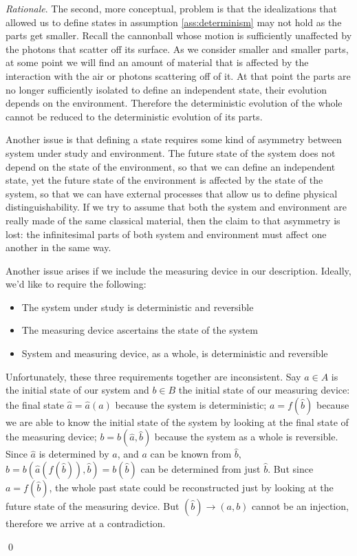 \documentclass[aps,pra,10pt,twocolumn,floatfix,nofootinbib]{revtex4-1}
\numberwithin{equation}{section}
\theoremstyle{definition}
\newenvironment{rationale}{\emph{Rationale}.}{\qed}
\begin{document}
\begin{rationale}
	The second, more conceptual, problem is that the idealizations that allowed us to define states in assumption \ref{ass:determinism} may not hold as the parts get smaller. Recall the cannonball whose motion is sufficiently unaffected by the photons that scatter off its surface. As we consider smaller and smaller parts, at some point we will find an amount of material that is affected by the interaction with the air or photons scattering off of it. At that point the parts are no longer sufficiently isolated to define an independent state, their evolution depends on the environment. Therefore the deterministic evolution of the whole cannot be reduced to the deterministic evolution of its parts.
	
	Another issue is that defining a state requires some kind of asymmetry between system under study and environment. The future state of the system does not depend on the state of the environment, so that we can define an independent state, yet the future state of the environment is affected by the state of the system, so that we can have external processes that allow us to define physical distinguishability. If we try to assume that both the system and environment are really made of the same classical material, then the claim to that asymmetry is lost: the infinitesimal parts of both system and environment must affect one another in the same way.
	
	Another issue arises if we include the measuring device in our description. Ideally, we'd like to require the following:
	\begin{itemize}[noitemsep]
		\item The system under study is deterministic and reversible
		\item The measuring device ascertains the state of the system
		\item System and measuring device, as a whole, is deterministic and reversible
	\end{itemize}
	Unfortunately, these three requirements together are inconsistent. Say $a \in A$ is the initial state of our system and $b \in B$ the initial state of our measuring device: the final state $\hat{a}=\hat{a}(a)$ because the system is deterministic; $a=f(\hat{b})$ because we are able to know the initial state of the system by looking at the final state of the measuring device; $b=b(\hat{a},\hat{b})$ because the system as a whole is reversible. Since $\hat{a}$ is determined by $a$, and $a$ can be known from $\hat{b}$, $b = b(\hat{a}(f(\hat{b})), \hat{b}) = b(\hat{b})$ can be determined from just $\hat{b}$. But since $a=f(\hat{b})$, the whole past state could be reconstructed just by looking at the future state of the measuring device. But $(\hat{b}) \rightarrow (a, b)$ cannot be an injection, therefore we arrive at a contradiction.
	

\end{rationale}
\end{document}

